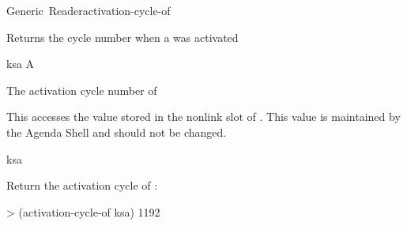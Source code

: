 \documentclass[10pt,twoside,english,pdftex]{article}
\begin{document}
\begin{functiondoc}{Generic~Reader}{activation-cycle-of}{ 
    \returns{} }
%
%

\fnsyntax

\fnpurpose Returns the cycle number when a  was activated

\fnmethods
{}

\fnpackage {}

\fnmodule {}

\fnargs
\begin{args}{ksa}
\arg[ksa] A 
\end{args}

\fnreturns The activation cycle number of 
  
\fndescription 
This  accesses the value stored in the 
 nonlink slot of .  This value is
maintained by the Agenda Shell and should not be changed.

\begin{alsos}{ksa}
\also[ksa]
\end{alsos}

\fnexample
Return the activation cycle of :
\begin{example}
> (activation-cycle-of ksa)
1192
\end{example}

\end{functiondoc}

\end{document}
